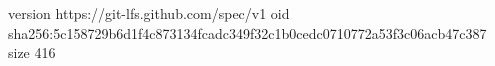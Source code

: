 version https://git-lfs.github.com/spec/v1
oid sha256:5c158729b6d1f4c873134fcadc349f32c1b0cedc0710772a53f3c06acb47c387
size 416
